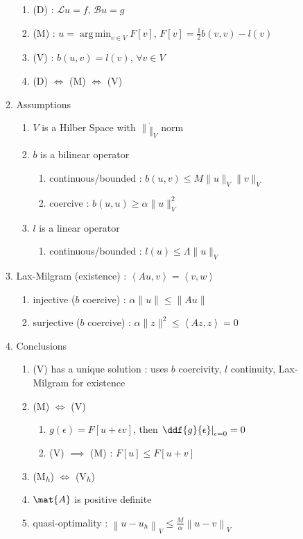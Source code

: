 \documentclass[10pt]{extarticle}
\DeclareMathOperator*{\argmin}{arg\,min}
\begin{document}
\begin{multicols}{2}
\begin{enumerate}
\begin{enumerate}
		\begin{enumerate}
			\item (D) : $\mathcal{L} u = f$, $\mathcal{B}u = g$
			\item (M) : $u = \argmin_{v \in V}F[v]$, $F[v] = \frac{1}{2}b(v,v) - l(v)$
			\item (V) : $b(u,v) = l(v)$, $\forall v \in V$
			\item (D) $\iff$ (M) $\iff$ (V)
		\end{enumerate}
		\item Assumptions
		\begin{enumerate}
			\item $V$ is a Hilber Space with $\|\dot\|_V$ norm
			\item $b$ is a bilinear operator
			\begin{enumerate}
				\item continuous/bounded : $b(u,v) \leq M\|u\|_V\|v\|_V$
				\item coercive : $b(u,u) \geq \alpha\|u\|_V^2$
			\end{enumerate}
			\item $l$ is a linear operator
			\begin{enumerate}
				\item continuous/bounded : $l(u) \leq \Lambda\|u\|_V$
			\end{enumerate}
		\end{enumerate}
		\item Lax-Milgram (existence) : $\left<Au,v\right> = \left<v,w\right>$
		\begin{enumerate}
			\item injective ($b$ coercive) : $\alpha\|u\| \leq \|Au\|$
			\item surjective ($b$ coercive) : $\alpha\|z\|^2 \leq \left<Az,z\right> = 0$
		\end{enumerate}
		\item Conclusions
		\begin{enumerate}
			\item (V) has a unique solution : uses $b$ coercivity, $l$ continuity, Lax-Milgram for existence
			\item  (M) $\iff$ (V)
			\begin{enumerate}
				\item $g(\epsilon) = F[u+\epsilon v]$, then $\left.\ddf{g}{\epsilon}\right|_{\epsilon=0} = 0$
				\item (V) $\implies$ (M) : $F[u] \leq F[u + v]$
			\end{enumerate}
			\item (M\textsubscript{$h$}) $\iff$ (V\textsubscript{$h$})
			\item $\mat{A}$ is positive definite
			\item quasi-optimality : $\left\|u-u_h\right\|_V \leq \frac{M}{\alpha}\left\|u-v\right\|_V$
		\end{enumerate}
	\end{enumerate}
\end{enumerate}
\end{multicols}
\end{document}
